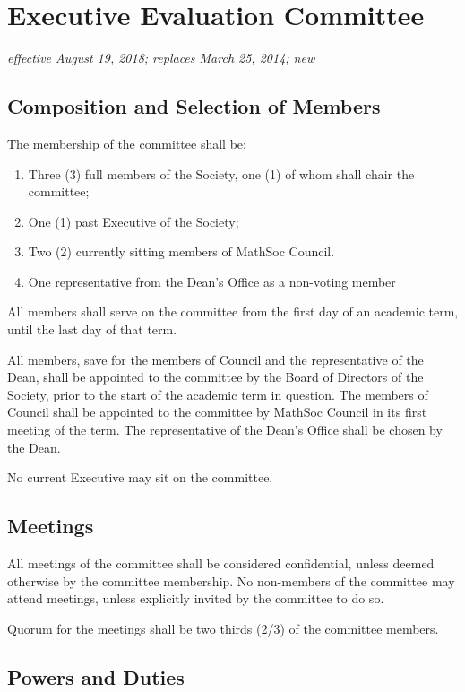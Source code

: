 \section{Executive Evaluation Committee}
\emph{effective August 19, 2018; replaces March 25, 2014; new}\\

\subsection{Composition and Selection of Members}
The membership of the committee shall be:
\begin{enumerate}
    \item Three (3) full members of the Society, one (1) of whom shall chair the
        committee;
    \item One (1) past Executive of the Society;
    \item Two (2) currently sitting members of MathSoc Council.
    \item One representative from the Dean’s Office as a non-voting member
\end{enumerate}

All members shall serve on the committee from the first day of an academic
term, until the last day of that term.

All members, save for the members of Council and the representative of the
Dean, shall be appointed to the committee by the Board of Directors of the
Society, prior to the start of the academic term in question. The members of
Council shall be appointed to the committee by MathSoc Council in its first
meeting of the term. The representative of the Dean’s Office shall be chosen by
the Dean.

No current Executive may sit on the committee.

\subsection{Meetings}

All meetings of the committee shall be considered confidential, unless deemed
otherwise by the committee membership. No non-members of the committee may
attend meetings, unless explicitly invited by the committee to do so.

Quorum for the meetings shall be two thirds (2/3) of the committee members.

\subsection{Powers and Duties}

